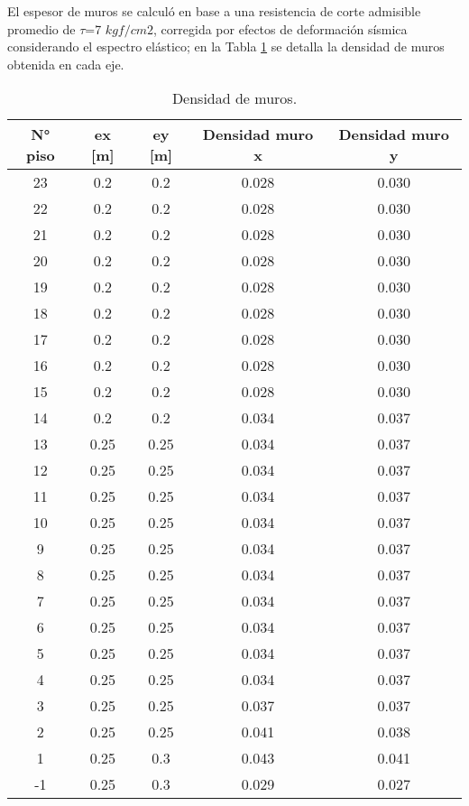 El espesor de muros se calculó en base a una resistencia de corte admisible promedio de $\tau$=7 $kgf/cm2$, corregida por efectos de deformación sísmica considerando el espectro elástico; en la Tabla \ref{tabla-densidades-muro} se detalla la densidad de muros obtenida en cada eje.

\begin{table}[H]
  \centering
  \caption{Densidad de muros.}
  \begin{tabular}{ccccc}
    \hline
    \textbf{N° piso} & \textbf{ex [m]} & \textbf{ey [m]} & \textbf{Densidad muro x} & \textbf{Densidad muro y} \bigstrut\\
    \hline
    23    & 0.2   & 0.2   & 0.028 & 0.030 \bigstrut[t]\\
    22    & 0.2   & 0.2   & 0.028 & 0.030 \\
    21    & 0.2   & 0.2   & 0.028 & 0.030 \\
    20    & 0.2   & 0.2   & 0.028 & 0.030 \\
    19    & 0.2   & 0.2   & 0.028 & 0.030 \\
    18    & 0.2   & 0.2   & 0.028 & 0.030 \\
    17    & 0.2   & 0.2   & 0.028 & 0.030 \\
    16    & 0.2   & 0.2   & 0.028 & 0.030 \\
    15    & 0.2   & 0.2   & 0.028 & 0.030 \\
    14    & 0.2   & 0.2   & 0.034 & 0.037 \\
    13    & 0.25  & 0.25  & 0.034 & 0.037 \\
    12    & 0.25  & 0.25  & 0.034 & 0.037 \\
    11    & 0.25  & 0.25  & 0.034 & 0.037 \\
    10    & 0.25  & 0.25  & 0.034 & 0.037 \\
    9     & 0.25  & 0.25  & 0.034 & 0.037 \\
    8     & 0.25  & 0.25  & 0.034 & 0.037 \\
    7     & 0.25  & 0.25  & 0.034 & 0.037 \\
    6     & 0.25  & 0.25  & 0.034 & 0.037 \\
    5     & 0.25  & 0.25  & 0.034 & 0.037 \\
    4     & 0.25  & 0.25  & 0.034 & 0.037 \\
    3     & 0.25  & 0.25  & 0.037 & 0.037 \\
    2     & 0.25  & 0.25  & 0.041 & 0.038 \\
    1     & 0.25  & 0.3   & 0.043 & 0.041 \\
    -1    & 0.25  & 0.3   & 0.029 & 0.027 \bigstrut[b]\\
    \hline
  \end{tabular}
  \label{tabla-densidades-muro}
\end{table}

